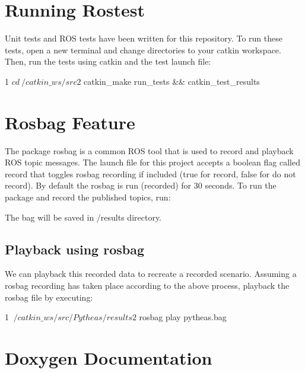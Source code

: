 \section*{Running Rostest}

Unit tests and R\+OS tests have been written for this repository. To run these tests, open a new terminal and change directories to your catkin workspace. Then, run the tests using catkin and the test launch file\+:


\begin{DoxyCode}
1 $ cd ~/catkin\_ws/src
2 $ catkin\_make run\_tests && catkin\_test\_results
\end{DoxyCode}


\section*{Rosbag Feature}

The package {\ttfamily rosbag} is a common R\+OS tool that is used to record and playback R\+OS topic messages. The launch file for this project accepts a boolean flag called {\ttfamily record} that toggles rosbag recording if included (true for record, false for do not record). By default the rosbag is run (recorded) for 30 seconds. To run the package and record the published topics, run\+:




The bag will be saved in /results directory.

\subsection*{Playback using rosbag}

We can playback this recorded data to recreate a recorded scenario. Assuming a rosbag recording has taken place according to the above process, playback the rosbag file by executing\+:


\begin{DoxyCode}
1 $ ~/catkin\_ws/src/Pytheas/results
2 $ rosbag play pytheas.bag
\end{DoxyCode}


\section*{Doxygen Documentation}

